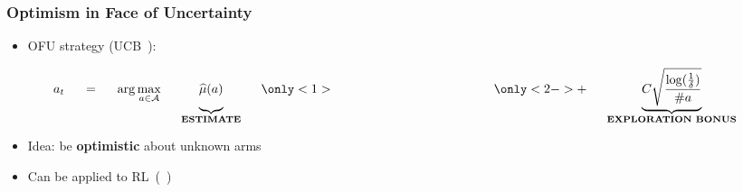 \documentclass[aspectratio=169, table]{beamer}
\newcommand{\enb}[1]{\textcolor{poliblue1}{\textbf{#1}}}
\begin{document}
\begin{frame}
\frametitle{Optimism in Face of Uncertainty}
\begin{itemize}
	\item<2-> OFU strategy (\eg UCB~\citep{lai1985asymptotically}):
\end{itemize}
	\[
	a_t\hspace{.5cm} =\hspace{.5cm} \arg\max_{a\in\Aspace}\hspace{.5cm} \underbrace{\vphantom{C\sqrt{\frac{\log(\frac{1}{\delta})}{\#a}}}\widehat{\mu}(a)}_{\textbf{ESTIMATE}} \hspace{.5cm}
	\only<1>{\phantom{+\hspace{.5cm} \underbrace{C\sqrt{\frac{\log(\frac{1}{\delta})}{\#a}}}_{\textbf{EXPLORATION BONUS}}}
	}
	\only<2->{+\hspace{.5cm} \underbrace{C\sqrt{\frac{\log(\frac{1}{\delta})}{\#a}}}_{\textbf{EXPLORATION BONUS}}}
	\]
\vspace{20pt}
\begin{itemize}
	\setlength{\itemsep}{20pt}
	\item<3-> Idea: be \enb{optimistic} about unknown arms
	\item<4-> Can be applied to RL~(\eg~\cite{jaksch2010near})
\end{itemize}
\end{frame}
\end{document}
